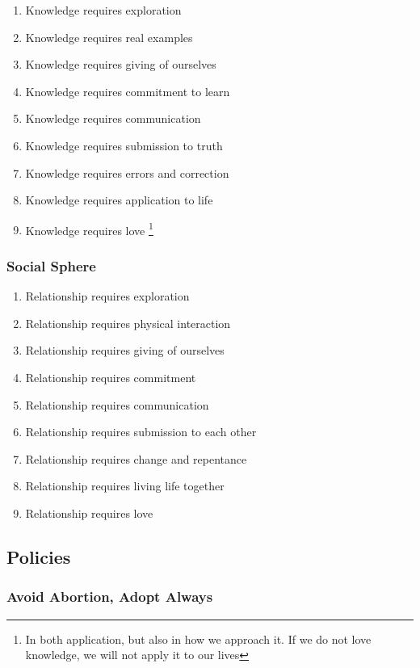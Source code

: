 \documentclass[CSHFoundation.tex]{subfiles}
\begin{document}
\begin{enumerate}
\item Knowledge requires exploration
\item Knowledge requires real examples
\item Knowledge requires giving of ourselves
\item Knowledge requires commitment to learn
\item Knowledge requires communication
\item Knowledge requires submission to truth
\item Knowledge requires errors and correction
\item Knowledge requires application to life
\item Knowledge requires love \footnote{In both application, but also in how we approach it. If we do not love knowledge, we will not apply it to our lives}
\end{enumerate}



\subsubsection{Social Sphere}



\begin{enumerate}
\item Relationship requires exploration
\item Relationship requires physical interaction
\item Relationship requires giving of ourselves
\item Relationship requires commitment
\item Relationship requires communication
\item Relationship requires submission to each other
\item Relationship requires change and repentance
\item Relationship requires living life together
\item Relationship requires love
\end{enumerate}

\subsection{Policies}

\subsubsection{Avoid Abortion, Adopt Always}
\end{document}
